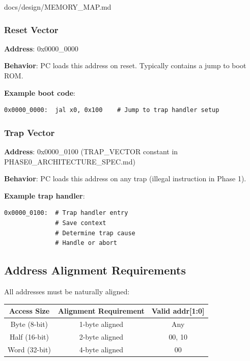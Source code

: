 \begin{relocated}{docs/design/MEMORY_MAP.md}
\subsubsection{Reset Vector}\label{ds:mm:memory-map:reset-vector}

\textbf{Address}: 0x0000\_\allowbreak{}0000

\textbf{Behavior}: PC loads this address on reset. Typically contains a
jump to boot ROM.

\textbf{Example boot code}:

\begin{lstlisting}[language={}]
0x0000_0000:  jal x0, 0x100    # Jump to trap handler setup
\end{lstlisting}

\subsubsection{Trap Vector}\label{ds:mm:memory-map:trap-vector}

\textbf{Address}: 0x0000\_\allowbreak{}0100 (TRAP\_\allowbreak{}VECTOR
constant in PHASE0\_\allowbreak{}ARCHITECTURE\_\allowbreak{}SPEC.md)

\textbf{Behavior}: PC loads this address on any trap (illegal
instruction in Phase 1).

\textbf{Example trap handler}:

\begin{lstlisting}[language={}]
0x0000_0100:  # Trap handler entry
              # Save context
              # Determine trap cause
              # Handle or abort
\end{lstlisting}

\subsection{Address Alignment Requirements}\label{ds:mm:memory-map:address-alignment-requirements}

All addresses must be naturally aligned:

{
\begin{longtable}[]{@{}ccc@{}}
\toprule\noalign{}
Access Size & Alignment Requirement & Valid addr{[}1:0{]} \\
\midrule\noalign{}
\endhead
\bottomrule\noalign{}
\endlastfoot
Byte (8-bit) & 1-byte aligned & Any \\
Half (16-bit) & 2-byte aligned & 00, 10 \\
Word (32-bit) & 4-byte aligned & 00 \\
\end{longtable}
}


\end{relocated}
